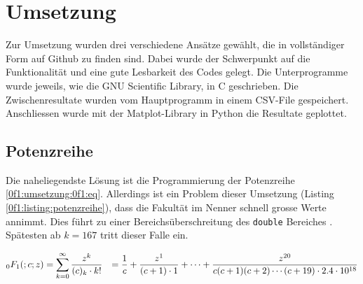 %
%
%
\section{Umsetzung
\label{0f1:section:teil2}}
Zur Umsetzung wurden drei verschiedene Ansätze gewählt, die in vollständiger Form auf Github \cite{0f1:code} zu finden sind. Dabei wurde der Schwerpunkt auf die Funktionalität und eine gute Lesbarkeit des Codes gelegt.
Die Unterprogramme wurde jeweils, wie die GNU Scientific Library, in C geschrieben. Die Zwischenresultate wurden vom Hauptprogramm in einem CSV-File gespeichert. Anschliessen wurde mit der Matplot-Library in Python die Resultate geplottet.

\subsection{Potenzreihe
\label{0f1:subsection:potenzreihe}}
Die naheliegendste Lösung ist die Programmierung der Potenzreihe \eqref{0f1:umsetzung:0f1:eq}. Allerdings ist ein Problem dieser Umsetzung (Listing \ref{0f1:listing:potenzreihe}), dass die Fakultät im Nenner schnell grosse Werte annimmt. Dies führt zu einer Bereichsüberschreitung des \verb+double+ Bereiches \cite{0f1:double}. Spätesten ab $k=167$ tritt dieser Falle ein.

\begin{align}
    \label{0f1:umsetzung:0f1:eq}
    \mathstrut_0F_1(;c;z)
    &=
    \sum_{k=0}^\infty
    \frac{z^k}{(c)_k \cdot k!}
    &= 
    \frac{1}{c}
    +\frac{z^1}{(c+1) \cdot 1}
    + \cdots
    + \frac{z^{20}}{c(c+1)(c+2)\cdots(c+19) \cdot 2.4 \cdot 10^{18}}
\end{align}



